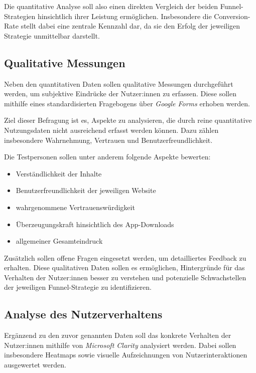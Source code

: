 Die quantitative Analyse soll also einen direkten Vergleich
der beiden Funnel-Strategien hinsichtlich ihrer Leistung 
ermöglichen. Insbesondere die Conversion-Rate stellt dabei eine 
zentrale Kennzahl dar, da sie den Erfolg der jeweiligen Strategie 
unmittelbar darstellt.

\subsection{Qualitative Messungen}

Neben den quantitativen Daten sollen qualitative Messungen 
durchgeführt werden, um subjektive Eindrücke der Nutzer:innen zu 
erfassen. Diese sollen mithilfe eines standardisierten Fragebogens 
über \textit{Google Forms} erhoben werden.

Ziel dieser Befragung ist es, Aspekte zu analysieren, 
die durch reine quantitative Nutzungsdaten nicht ausreichend 
erfasst werden können. Dazu zählen insbesondere Wahrnehmung, 
Vertrauen und Benutzerfreundlichkeit.

Die Testpersonen sollen unter anderem folgende Aspekte bewerten:

\begin{itemize}
    \item Verständlichkeit der Inhalte
    \item Benutzerfreundlichkeit der jeweiligen Website
    \item wahrgenommene Vertrauenswürdigkeit
    \item Überzeugungskraft hinsichtlich des App-Downloads
    \item allgemeiner Gesamteindruck
\end{itemize}

Zusätzlich sollen offene Fragen eingesetzt werden, 
um detailliertes Feedback zu erhalten. Diese qualitativen 
Daten sollen es ermöglichen, Hintergründe für das Verhalten 
der Nutzer:innen besser zu verstehen und potenzielle Schwachstellen 
der jeweiligen Funnel-Strategie zu identifizieren.

\subsection{Analyse des Nutzerverhaltens}

Ergänzend zu den zuvor genannten Daten soll das konkrete Verhalten 
der Nutzer:innen mithilfe von \textit{Microsoft Clarity} analysiert 
werden. Dabei sollen insbesondere Heatmaps sowie visuelle 
Aufzeichnungen von Nutzerinteraktionen ausgewertet werden.

